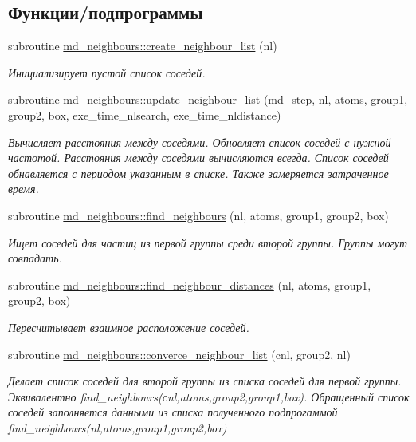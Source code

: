 \subsection*{Функции/подпрограммы}
\begin{DoxyCompactItemize}
\item 
subroutine \mbox{\hyperlink{namespacemd__neighbours_a7246ea26ccbca29fb308ef82c2740bc9}{md\+\_\+neighbours\+::create\+\_\+neighbour\+\_\+list}} (nl)
\begin{DoxyCompactList}\small\item\em Инициализирует пустой список соседей. \end{DoxyCompactList}\item 
subroutine \mbox{\hyperlink{namespacemd__neighbours_aa3afc442e82c37b20e8963af79455747}{md\+\_\+neighbours\+::update\+\_\+neighbour\+\_\+list}} (md\+\_\+step, nl, atoms, group1, group2, box, exe\+\_\+time\+\_\+nlsearch, exe\+\_\+time\+\_\+nldistance)
\begin{DoxyCompactList}\small\item\em Вычисляет расстояния между соседями. Обновляет список соседей с нужной частотой.  Расстояния между соседями вычисляются всегда. Список соседей обнавляется с периодом указанным в списке. Также замеряется затраченное время. \end{DoxyCompactList}\item 
subroutine \mbox{\hyperlink{namespacemd__neighbours_a037f048abc67c7d83799c76aabaa8dac}{md\+\_\+neighbours\+::find\+\_\+neighbours}} (nl, atoms, group1, group2, box)
\begin{DoxyCompactList}\small\item\em Ищет соседей для частиц из первой группы среди второй группы.  Группы могут совпадать. \end{DoxyCompactList}\item 
subroutine \mbox{\hyperlink{namespacemd__neighbours_ad313293c81b7fa1b52e8376710c84c0f}{md\+\_\+neighbours\+::find\+\_\+neighbour\+\_\+distances}} (nl, atoms, group1, group2, box)
\begin{DoxyCompactList}\small\item\em Пересчитывает взаимное расположение соседей. \end{DoxyCompactList}\item 
subroutine \mbox{\hyperlink{namespacemd__neighbours_a3f6d619145cba9b77814f398056c243f}{md\+\_\+neighbours\+::converce\+\_\+neighbour\+\_\+list}} (cnl, group2, nl)
\begin{DoxyCompactList}\small\item\em Делает список соседей для второй группы из списка соседей для первой группы.  Эквивалентно find\+\_\+neighbours(сnl,atoms,group2,group1,box). Обращенный список соседей заполняется данными из списка полученного подпрогаммой find\+\_\+neighbours(nl,atoms,group1,group2,box) \end{DoxyCompactList}\end{DoxyCompactItemize}
